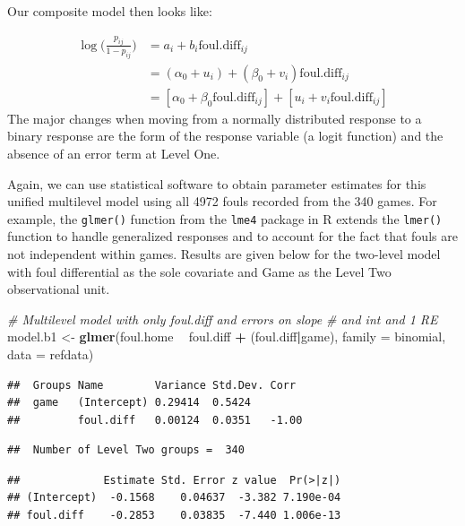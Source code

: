 \documentclass[
]{krantz}
\newenvironment{Shaded}{\begin{snugshade}}{\end{snugshade}}
\newcommand{\CommentTok}[1]{\textcolor[rgb]{0.37,0.37,0.37}{\textit{#1}}}
\newcommand{\DataTypeTok}[1]{\textcolor[rgb]{0.27,0.27,0.27}{#1}}
\newcommand{\KeywordTok}[1]{\textcolor[rgb]{0.27,0.27,0.27}{\textbf{#1}}}
\newcommand{\NormalTok}[1]{#1}
\newcommand{\OperatorTok}[1]{\textcolor[rgb]{0.43,0.43,0.43}{\textbf{#1}}}
\newcommand{\StringTok}[1]{\textcolor[rgb]{0.5,0.5,0.5}{#1}}
\begin{document}
Our composite model then looks like:

\begin{align*}
\log\bigg(\frac{p_{ij}}{1-p_{ij}}\bigg) & = a_i+b_i\mathrm{foul.diff}_{ij} \\
 & = (\alpha_{0}+u_i) + (\beta_{0}+v_i)\mathrm{foul.diff}_{ij} \\
 & = [\alpha_{0}+\beta_{0}\mathrm{foul.diff}_{ij}]+[u_i+v_i\mathrm{foul.diff}_{ij}]
\end{align*}
The major changes when moving from a normally distributed response to a binary response are the form of the response variable (a logit function) and the absence of an error term at Level One.

Again, we can use statistical software to obtain parameter estimates for this unified multilevel model using all 4972 fouls recorded from the 340 games. For example, the \texttt{glmer()} function from the \texttt{lme4} package in R extends the \texttt{lmer()} function to handle generalized responses and to account for the fact that fouls are not independent within games. Results are given below for the two-level model with foul differential as the sole covariate and Game as the Level Two observational unit.

\begin{Shaded}
\begin{Highlighting}[]
\CommentTok{# Multilevel model with only foul.diff and errors on slope }
\CommentTok{#   and int and 1 RE}
\NormalTok{model.b1 <-}\StringTok{ }\KeywordTok{glmer}\NormalTok{(foul.home }\OperatorTok{~}\StringTok{ }\NormalTok{foul.diff }\OperatorTok{+}\StringTok{ }\NormalTok{(foul.diff}\OperatorTok{|}\NormalTok{game),}
                  \DataTypeTok{family =}\NormalTok{ binomial, }\DataTypeTok{data =}\NormalTok{ refdata)}
\end{Highlighting}
\end{Shaded}

\begin{verbatim}
##  Groups Name        Variance Std.Dev. Corr 
##  game   (Intercept) 0.29414  0.5424        
##         foul.diff   0.00124  0.0351   -1.00
\end{verbatim}

\begin{verbatim}
##  Number of Level Two groups =  340
\end{verbatim}

\begin{verbatim}
##             Estimate Std. Error z value  Pr(>|z|)
## (Intercept)  -0.1568    0.04637  -3.382 7.190e-04
## foul.diff    -0.2853    0.03835  -7.440 1.006e-13
\end{verbatim}
\end{document}
